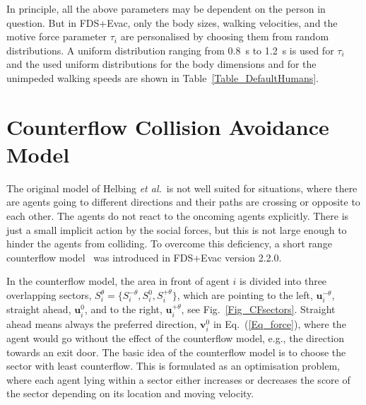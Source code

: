 \documentclass[12pt,a4paper,final,twoside]{stylevk}
\begin{document}
In principle, all the above parameters may be dependent on the person
in question.  But in FDS+Evac, only the body sizes, walking
velocities, and the motive force parameter $\tau_i$ are personalised
by choosing them from random distributions.  A uniform distribution
ranging from 0.8~s to 1.2~s is used for $\tau_i$ and the used uniform
distributions for the body dimensions and for the unimpeded walking
speeds are shown in Table~\ref{Table_DefaultHumans}.


\section{Counterflow Collision Avoidance Model}\label{Sec_CF_Model}

\noindent The original model of Helbing \emph{et al.}\ is not well
suited for situations, where there are agents going to different
directions and their paths are crossing or opposite to each other.
The agents do not react to the oncoming agents explicitly.  There is
just a small implicit action by the social forces, but this is not
large enough to hinder the agents from colliding.  To overcome this
deficiency, a short range counterflow model~\cite{Heliovaara12} was
introduced in FDS+Evac version 2.2.0.


In the counterflow model, the area in front of agent $i$ is divided
into three overlapping sectors, $S^{\theta}_i = \lbrace S^{-\theta}_i
, S^{0}_i , S^{+\theta}_i \rbrace$, which are pointing to the left,
$\mathbf{u}^{-\theta}_i$, straight ahead, $\mathbf{u}^{0}_i$, and to
the right, $\mathbf{u}^{+\theta}_i$, see
Fig.~\ref{Fig_CFsectors}.  Straight ahead means always the
preferred direction, $\mathbf{v}_i^0$ in Eq.~(\ref{Eq_force}), where
the agent would go without the effect of the counterflow model, e.g.,
the direction towards an exit door.  The basic idea of the counterflow
model is to choose the sector with least counterflow.  This is
formulated as an optimisation problem, where each agent lying within a
sector either increases or decreases the score of the sector depending
on its location and moving velocity.
\end{document}
